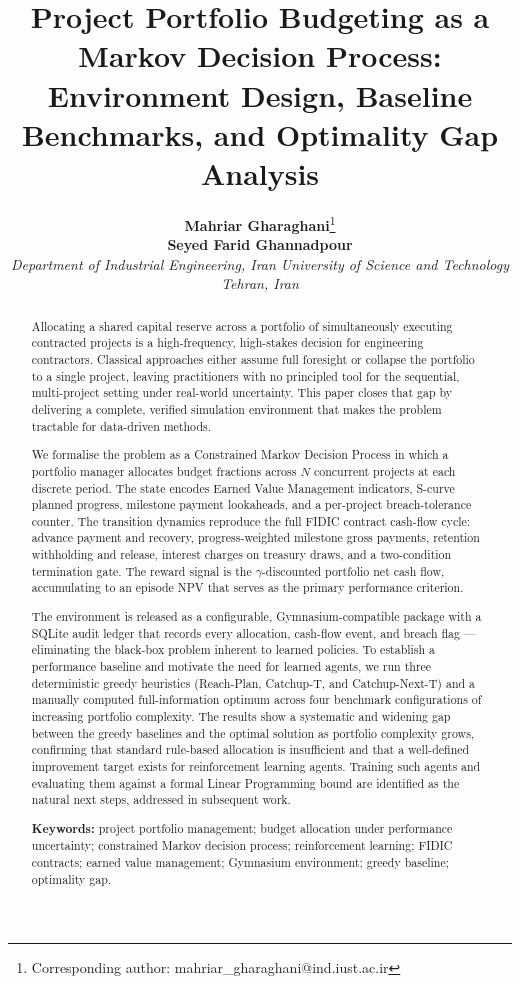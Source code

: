 \documentclass[11pt,a4paper]{article}
\title{\textbf{Project Portfolio Budgeting as a Markov Decision Process:
Environment Design, Baseline Benchmarks, and Optimality Gap Analysis}}
\author{
\begin{tabular}{c}
    \textbf{Mahriar Gharaghani}\thanks{Corresponding author: mahriar\_gharaghani@ind.iust.ac.ir} \\
    \textbf{Seyed Farid Ghannadpour} \\[6pt]
    \textit{Department of Industrial Engineering, Iran University of Science and Technology} \\
    \textit{Tehran, Iran}
\end{tabular}
}
\date{}
\theoremstyle{definition}
\theoremstyle{remark}
\begin{document}
\maketitle


\begin{abstract}

  Allocating a shared capital reserve across a portfolio of simultaneously
  executing contracted projects is a high-frequency, high-stakes decision for
  engineering contractors.  Classical approaches either assume full foresight or
  collapse the portfolio to a single project, leaving practitioners with no
  principled tool for the sequential, multi-project setting under real-world
  uncertainty.  This paper closes that gap by delivering a complete, verified
  simulation environment that makes the problem tractable for data-driven methods.
  
  We formalise the problem as a Constrained Markov Decision Process in which a
  portfolio manager allocates budget fractions across $N$ concurrent projects at
  each discrete period.  The state encodes Earned Value Management indicators,
  S-curve planned progress, milestone payment lookaheads, and a per-project
  breach-tolerance counter.  The transition dynamics reproduce the full FIDIC
  contract cash-flow cycle: advance payment and recovery, progress-weighted
  milestone gross payments, retention withholding and release, interest charges
  on treasury draws, and a two-condition termination gate.  The reward signal is
  the $\gamma$-discounted portfolio net cash flow, accumulating to an episode NPV
  that serves as the primary performance criterion.
  
  The environment is released as a configurable, Gymnasium-compatible package
  with a SQLite audit ledger that records every allocation, cash-flow event, and
  breach flag --- eliminating the black-box problem inherent to learned policies.
  To establish a performance baseline and motivate the need for learned agents,
  we run three deterministic greedy heuristics (Reach-Plan, Catchup-T, and
  Catchup-Next-T) and a manually computed full-information optimum across four
  benchmark configurations of increasing portfolio complexity.  The results show
  a systematic and widening gap between the greedy baselines and the optimal
  solution as portfolio complexity grows, confirming that standard rule-based
  allocation is insufficient and that a well-defined improvement target exists
  for reinforcement learning agents.  Training such agents and evaluating them
  against a formal Linear Programming bound are identified as the natural next
  steps, addressed in subsequent work.
  
  \medskip
  \noindent\textbf{Keywords:} project portfolio management; budget allocation
  under performance uncertainty; constrained Markov decision process;
  reinforcement learning; FIDIC contracts; earned value management;
  Gymnasium environment; greedy baseline; optimality gap.
  
  \end{abstract}
\end{document}
